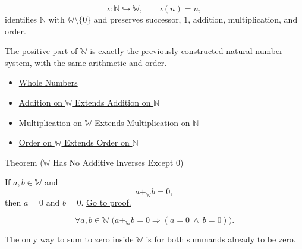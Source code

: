 \begin{remark*}
\[
\iota:\mathbb{N}\hookrightarrow\mathbb{W},\qquad \iota(n)=n,
\]
identifies $\mathbb{N}$ with $\mathbb{W}\setminus\{0\}$ and preserves
successor, $1$, addition, multiplication, and order.
\end{remark*}

\begin{remark*}[Interpretation]
The positive part of $\mathbb{W}$ is exactly the previously constructed
natural-number system, with the same arithmetic and order.
\end{remark*}

\begin{dependencies}
\begin{itemize}
  \item \hyperref[def:whole-numbers]{Whole Numbers}
  \item \hyperref[thm:addition-on-w-extends-addition-on-n]{Addition on $\mathbb{W}$ Extends Addition on $\mathbb{N}$}
  \item \hyperref[thm:multiplication-on-w-extends-multiplication-on-n]{Multiplication on $\mathbb{W}$ Extends Multiplication on $\mathbb{N}$}
  \item \hyperref[thm:order-on-w-extends-order-on-n]{Order on $\mathbb{W}$ Extends Order on $\mathbb{N}$}
\end{itemize}
\end{dependencies}

\begin{theorembox}{Theorem (\texorpdfstring{$\mathbb{W}$}{W} Has No Additive Inverses Except \texorpdfstring{$0$}{0})}
\begin{theorem}
\label{thm:w-has-no-additive-inverses-except-zero}
If $a,b\in\mathbb{W}$ and
\[
a+_{\mathbb{W}}b=0,
\]
then $a=0$ and $b=0$.
\hyperref[prf:w-has-no-additive-inverses-except-zero]{Go to proof.}
\end{theorem}
\end{theorembox}

\begin{remark*}
\[
\forall a,b\in\mathbb{W}\;
\bigl(a+_{\mathbb{W}}b=0 \Longrightarrow (a=0\ \wedge\ b=0)\bigr).
\]
\end{remark*}

\begin{remark*}[Interpretation]
The only way to sum to zero inside $\mathbb{W}$ is for both summands already
to be zero.
\end{remark*}

